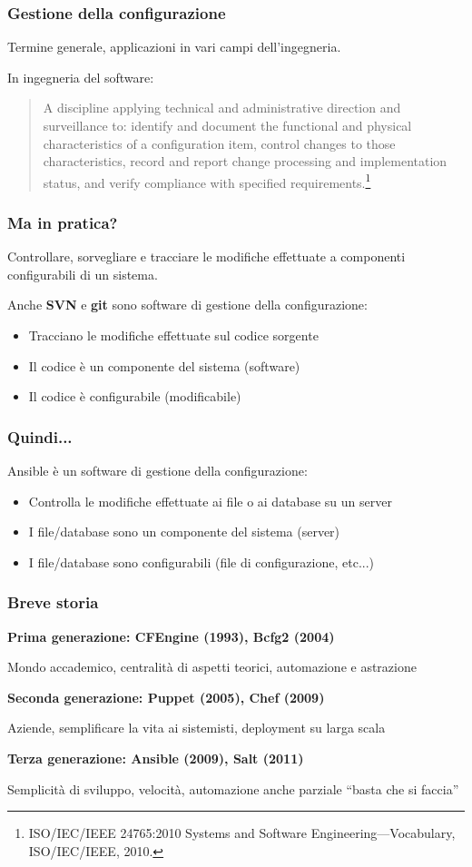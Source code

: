 \documentclass{beamer}
\begin{document}
\begin{frame}
\frametitle{Gestione della configurazione}
	Termine generale, applicazioni in vari campi dell'ingegneria.
	
	In ingegneria del software:
	\newline
	
	\begin{quote}
		A discipline applying technical and administrative direction and surveillance to: identify and document the functional and physical characteristics of a configuration item, control changes to those characteristics, record and report change processing and implementation status, and verify compliance with specified requirements.\footnote{ISO/IEC/IEEE 24765:2010 Systems and Software Engineering—Vocabulary, ISO/IEC/IEEE, 2010.}
	\end{quote}
\end{frame}

\begin{frame}
\frametitle{Ma in pratica?}
Controllare, sorvegliare e tracciare le modifiche effettuate a componenti configurabili di un sistema.

Anche \textbf{SVN} e \textbf{git} sono software di gestione della configurazione:
\begin{itemize}
	\item Tracciano le modifiche effettuate sul codice sorgente
	\item Il codice è un componente del sistema (software)
	\item Il codice è configurabile (modificabile)
\end{itemize}
\end{frame}

\begin{frame}
\frametitle{Quindi...}
Ansible è un software di gestione della configurazione:
\begin{itemize}
	\item Controlla le modifiche effettuate ai file o ai database su un server
	\item I file/database sono un componente del sistema (server)
	\item I file/database sono configurabili (file di configurazione, etc...)
\end{itemize}
\end{frame}

\begin{frame}
\frametitle{Breve storia}
\textbf{Prima generazione: CFEngine (1993), Bcfg2 (2004)}

Mondo accademico, centralità di aspetti teorici, automazione e astrazione

\textbf{Seconda generazione: Puppet (2005), Chef (2009)}

Aziende, semplificare la vita ai sistemisti, deployment su larga scala

\textbf{Terza generazione: Ansible (2009), Salt (2011)}

Semplicità di sviluppo, velocità, automazione anche parziale ``basta che si faccia''

\end{frame}
\end{document}
